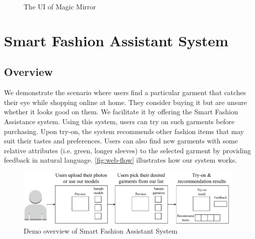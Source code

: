 \begin{figure}[ht]
    \centering
    \caption{The UI of Magic Mirror}
    \label{fig:ar-ui}
    \vspace{-2mm}
\end{figure}

\section{Smart Fashion Assistant System}

\subsection{Overview}
 We demonstrate the scenario where users find a particular garment that catches their eye while shopping online at home. They consider buying it but are unsure whether it looks good on them. We facilitate it by offering the Smart Fashion Assistance system. Using this system, users can try on such garments before purchasing. Upon try-on, the system recommends other fashion items that may suit their tastes and preferences. Users can also find new garments with some relative attributes (i.e. green, longer sleeves) to the selected garment by providing feedback in natural language. \autoref{fig:web-flow} illustrates how our system works.

 \begin{figure}[h!]
  \centering
  \includegraphics[width=\textwidth]{content/resources/images/application/chapter5-web-flow.pdf}
  \caption{Demo overview of Smart Fashion Assistant System}
  \label{fig:web-flow}
\end{figure}

